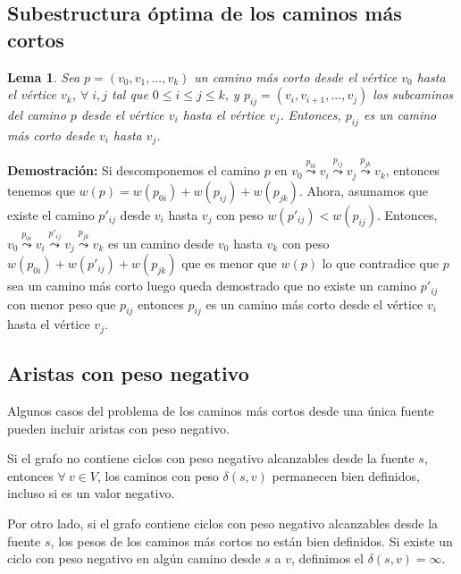 \documentclass[12pt]{article}
\newcommand{\proof}{\textbf{Demostración:} }
\newcommand{\nl}{\vspace{0.3cm}}
\newtheorem{lemma}{Lema}
\begin{document}
\subsection{Subestructura óptima de los caminos más cortos}

\nl

\begin{lemma} Sea $p = (v_0, v_1, ... , v_k)$ un camino más corto desde el vértice $v_0$ hasta el vértice $v_k$, $\forall \;i, j$ tal que $0 \leqslant i \leqslant j \leqslant k$, y $p_{ij} = (v_i, v_{i+1}, ..., v_j)$ los subcaminos del camino $p$ desde el vértice $v_i$ hasta el vértice $v_j$. Entonces, $p_{ij}$ es un camino más corto desde $v_i$ hasta $v_j$.
\end{lemma}

\proof Si descomponemos el camino $p$ en $v_0 \stackrel{p_{0i}}{\leadsto} v_i \stackrel{p_{ij}}{\leadsto} v_j \stackrel{p_{jk}}{\leadsto} v_k$, entonces tenemos que $w(p) = w(p_{0i}) + w(p_{ij}) + w(p_{jk})$. Ahora, asumamos que existe el camino $p'_{ij}$ desde $v_i$ hasta $v_j$ con peso $w(p'_{ij}) < w(p_{ij})$. Entonces, $v_0 \stackrel{p_{0i}}{\leadsto} v_i \stackrel{p'_{ij}}{\leadsto} v_j \stackrel{p_{jk}}{\leadsto} v_k$ es un camino desde $v_0$ hasta $v_k$ con peso $w(p_{0i}) + w(p'_{ij}) + w(p_{jk})$ que es menor que $w(p)$ lo que contradice que $p$ sea un camino más corto luego queda demostrado que no existe un camino $p'_{ij}$ con menor peso que $p_{ij}$ entonces $p_{ij}$ es un camino más corto desde el vértice $v_i$ hasta el vértice $v_j$.

\subsection{Aristas con peso negativo}

Algunos casos del problema de los caminos más cortos desde una única fuente pueden incluir aristas con peso negativo.

\nl

Si el grafo no contiene ciclos con peso negativo alcanzables desde la fuente $s$, entonces $\forall \ v \in V$, los caminos con peso $\delta(s, v)$ permanecen bien definidos, incluso si es un valor negativo.

\nl

Por otro lado, si el grafo contiene ciclos con peso negativo alcanzables desde la fuente $s$, los pesos de los caminos más cortos no están bien definidos. Si existe un ciclo con peso negativo en algún camino desde $s$ a $v$, definimos el $\delta(s, v) = \infty$.
\end{document}
